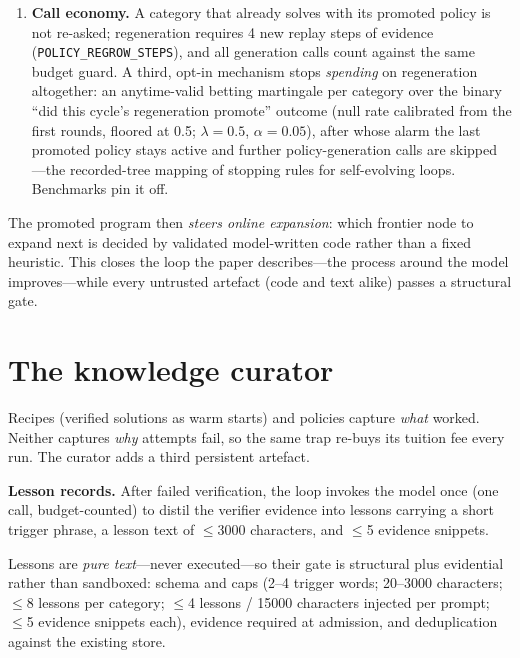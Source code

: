 \documentclass[11pt,a4paper]{article}
\newcommand{\hdr}[1]{\textbf{#1}}
\begin{document}
\begin{enumerate}
  over a horizon of $\geq$8 recorded steps (\texttt{MIN\_HORIZON}), and a
  rollout score strictly beating the greedy baseline under the shared
  objective (a tie is not evidence --- the same strictness the lesson gate
  applies).
  When an incumbent exists it is \emph{re-scored on the current tree} rather
  than trusted at its stored score: the replay world grows between cycles,
  and an old threshold would admit candidates that are genuinely worse than
  the incumbent on today's evidence.
  \item \hdr{Call economy.} A category that already solves with its promoted
  policy is not re-asked; regeneration requires 4 new replay steps of
  evidence (\texttt{POLICY\_REGROW\_STEPS}), and all generation calls count
  against the same budget guard. A third, opt-in mechanism stops
  \emph{spending} on regeneration altogether: an anytime-valid betting
  martingale per category over the binary ``did this cycle's regeneration
  promote'' outcome (null rate calibrated from the first rounds, floored at
  0.5; $\lambda{=}0.5$, $\alpha{=}0.05$), after whose alarm the last
  promoted policy stays active and further policy-generation calls are
  skipped \cite{evostop}---the recorded-tree mapping of stopping rules for
  self-evolving loops. Benchmarks pin it off.
\end{enumerate}

The promoted program then \emph{steers online expansion}: which frontier node
to expand next is decided by validated model-written code rather than a fixed
heuristic. This closes the loop the paper describes---the process around the
model improves---while every untrusted artefact (code and text alike) passes a
structural gate.

\section{The knowledge curator}
\label{sec:curator}

Recipes (verified solutions as warm starts) and policies capture \emph{what}
worked. Neither captures \emph{why} attempts fail, so the same trap re-buys
its tuition fee every run. The curator adds a third persistent artefact.

\hdr{Lesson records.} After failed verification, the loop invokes the model
once (one call, budget-counted) to distil the verifier evidence into lessons
carrying a short trigger phrase, a lesson text of $\leq$3000 characters, and
$\leq$5 evidence snippets.

Lessons are \emph{pure text}---never executed---so their gate is structural
plus evidential rather than sandboxed: schema and caps (2--4 trigger words;
20--3000 characters; $\leq$8 lessons per category; $\leq$4 lessons / 15000
characters injected per prompt; $\leq$5 evidence snippets each), evidence
required at admission, and deduplication against the existing store.
\end{document}

